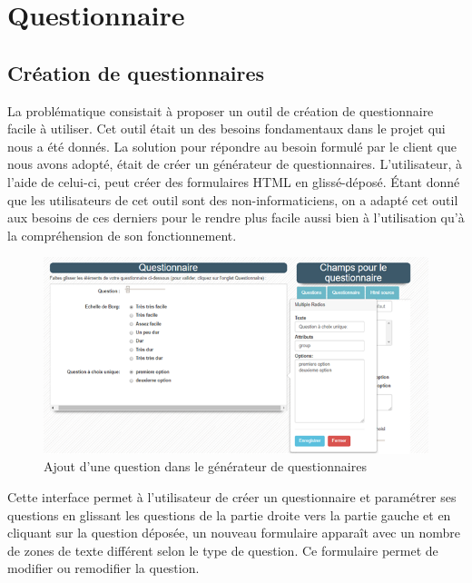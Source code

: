 \section{Questionnaire}

\subsection{Création de questionnaires}
La problématique consistait à proposer un outil de création de questionnaire facile à utiliser. Cet outil était un des besoins fondamentaux dans le projet qui nous a été donnés. La solution pour répondre au besoin formulé par le client que nous avons adopté, était de créer un générateur de questionnaires. L’utilisateur, à l'aide de celui-ci, peut créer des formulaires HTML en glissé-déposé. Étant donné que les utilisateurs de cet outil sont des non-informaticiens, on a adapté cet outil aux besoins de ces derniers pour le rendre plus facile aussi bien à l’utilisation qu'à la compréhension de son fonctionnement.

\begin{figure}[H]
    \begin{center}
	\includegraphics[scale=0.8]{img/questionnaire/modification}
    \end{center}
    \caption{Ajout d'une question dans le générateur de questionnaires}
\end{figure}



Cette interface permet à l'utilisateur de créer un questionnaire et paramétrer ses questions en glissant les questions de la partie droite vers la partie gauche et en cliquant sur la question déposée, un nouveau formulaire apparaît avec un nombre de zones de texte différent selon le type de question. Ce formulaire permet de modifier ou remodifier la question.


